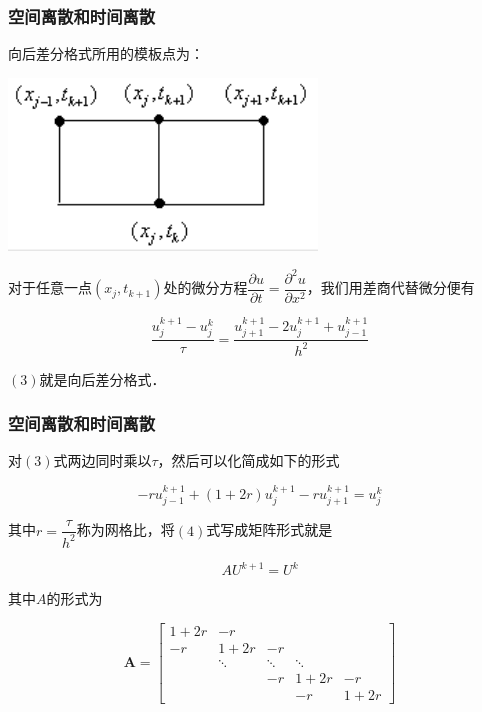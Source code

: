 \documentclass[UTF8]{beamer}
\begin{document}
\begin{frame}[t]\frametitle{空间离散和时间离散}

向后差分格式所用的模板点为：

\begin{center}
\includegraphics[scale=0.4]{1.png}
\end{center}

对于任意一点$(x_j,t_{k+1})$处的微分方程$\dfrac{\partial u}{\partial t} = \dfrac{\partial^2 u}{\partial x^2}$，我们用差商代替微分便有

\begin{equation}
\dfrac{u_j^{k+1}-u_j^k}{\tau} = \dfrac{u_{j+1}^{k+1}-2u_j^{k+1}+u_{j-1}^{k+1}}{h^2}
\end{equation}

$(3)$就是向后差分格式．

\end{frame}

\begin{frame}[t]\frametitle{空间离散和时间离散}

对$(3)$式两边同时乘以$\tau$，然后可以化简成如下的形式

\begin{equation}
-ru_{j-1}^{k+1}+(1+2r)u_j^{k+1}-ru_{j+1}^{k+1}=u_j^k
\end{equation}

其中$r=\dfrac{\tau}{h^2}$称为网格比，将$(4)$式写成矩阵形式就是

\begin{equation}
AU^{k+1}=U^k
\end{equation}

其中$A$的形式为

\[
\mathbf{A}=\left [ 
\begin{array}{ccccc}
1+2r & -r &  &  & \\
-r & 1+2r & -r &  & \\
   & \ddots & \ddots & \ddots & \\
 &  & -r & 1+2r & -r \\
 &  &  &-r  &1+2r 
\end{array}
 \right]
\]

\end{frame}
\end{document}
